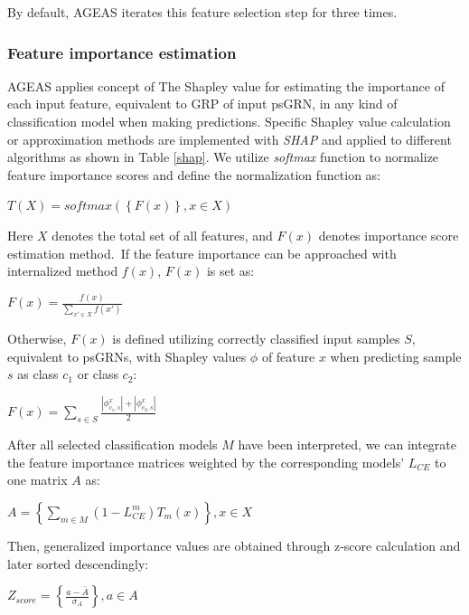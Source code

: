 \documentclass[fleqn,10pt]{wlscirep}
\begin{document}
    By default, AGEAS iterates this feature selection step for three times.

    \subsubsection*{Feature importance estimation}
      \label{features_importances}
      AGEAS applies concept of The Shapley value\cite{roth_1988} for estimating the importance of each input feature, equivalent to GRP of input psGRN, in any kind of classification model when making predictions.
      Specific Shapley value calculation or approximation methods are implemented with \emph{SHAP}\cite{lundberg2017unified} and applied to different algorithms as shown in Table \ref{shap}.
      We utilize \emph{softmax} function to normalize feature importance scores and define the normalization function as:

      \centerline{$T(X) = softmax(\left\{ F(x) \right\}, x \in X)$}

      \noindent Here $X$ denotes the total set of all features, and $F(x)$ denotes importance score estimation method.\
      If the feature importance can be approached with internalized method $f(x)$, $F(x)$ is set as:

      \centerline{$F(x) = \frac{f(x)}{\sum_{x' \in X} f(x')}$}

      \noindent Otherwise, $F(x)$ is defined utilizing correctly classified input samples $S$, equivalent to psGRNs, with Shapley values $\phi$ of feature $x$ when predicting sample $s$ as class $c_1$ or class $c_2$:\

      \centerline{$F(x) = \sum_{s \in S}\frac{\left|\phi_{c_1,s}^{x}\right| + \left|\phi_{c_2,s}^{x}\right|}{2}$}

      \noindent After all selected classification models $M$ have been interpreted, we can integrate the feature importance matrices weighted by the corresponding models' $L_{CE}$ to one matrix $A$ as:\

      \centerline{
        $ A = \left\{ \sum_{m \in M}(1 - L_{CE}^{m})T_{m}(x) \right\}, x \in X $
      }

      \noindent Then, generalized importance values are obtained through z-score calculation and later sorted descendingly:\

      \centerline{
        $Z_{score} = \left\{\frac{a - \bar{A}}{\sigma_A}\right\}, a \in A$
      }
\end{document}
